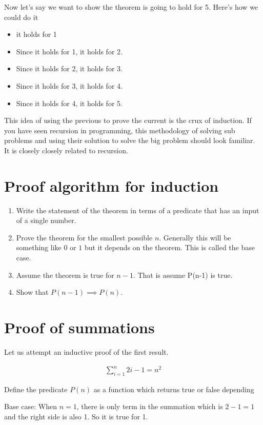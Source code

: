 \documentclass[12pt]{article}
\begin{document}
Now let's say we want to show the theorem is going to hold for 5. Here's how we could do it

\begin{itemize}
\item it holds for 1
\item Since it holds for 1, it holds for 2.
\item Since it holds for 2, it holds for 3.
\item Since it holds for 3, it holds for 4.
\item Since it holds for 4, it holds for 5.
\end{itemize}

This idea of using the previous to prove the current is the crux of induction. If you have seen recursion in programming, this methodology of solving sub problems and using their solution to solve the big problem should look familiar. It is closely closely related to recursion. 

\section*{Proof algorithm for induction}

\begin{enumerate}
\item Write the statement of the theorem in terms of a predicate that has an input of a single number.
\item Prove the theorem for the smallest possible $n$. Generally this will be something like $0$ or $1$ but it depends on the theorem. This is called the base case.
\item Assume the theorem is true for $n-1$. That is assume P(n-1) is true.
\item Show that $P(n-1) \implies P(n)$.
\end{enumerate}

\section*{Proof of summations}

Let us attempt an inductive proof of the first result.

\begin{align*}
\sum_{i=1}^n 2i - 1 = n^2
\end{align*}

Define the predicate $P(n)$ as a function which returns true or false depending 

Base case: When $n=1$, there is only term in the summation which is $ 2 - 1 = 1$ and the right side is also 1. So it is true for 1.
\end{document}
